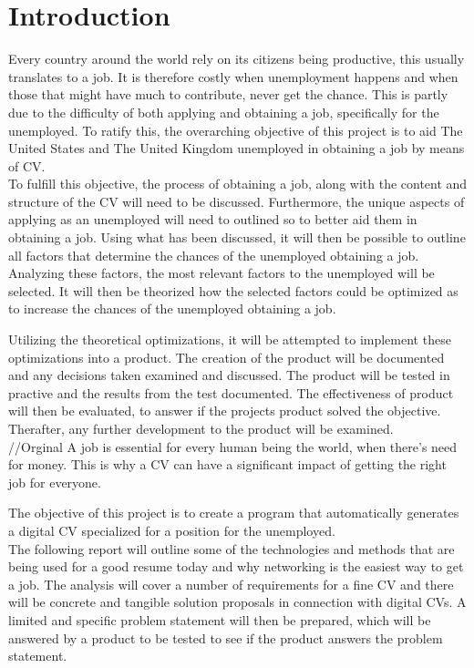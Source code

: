 \section{Introduction}\label{sec:introduction}
Every country around the world rely on its citizens being productive, this usually translates to a job. 
It is therefore costly when unemployment happens and when those that might have much to contribute, never get the chance. 
This is partly due to the difficulty of both applying and obtaining a job, specifically for the unemployed. 
To ratify this, the overarching objective of this project is to aid The United States and The United Kingdom unemployed in obtaining a job by means of CV. \\

To fulfill this objective, the process of obtaining a job, along with the content and structure of the CV will need to be discussed.
Furthermore, the unique aspects of applying as an unemployed will need to outlined so to better aid them in obtaining a job.
Using what has been discussed, it will then be possible to outline all factors that determine the chances of the unemployed obtaining a job. \\

Analyzing these factors, the most relevant factors to the unemployed will be selected.
It will then be theorized how the selected factors could be optimized as to increase the chances of the unemployed obtaining a job.

Utilizing the theoretical optimizations, it will be attempted to implement these optimizations into a product.
The creation of the product will be documented and any decisions taken examined and discussed. 
The product will be tested in practive and the results from the test documented.
The effectiveness of product will then be evaluated, to answer if the projects product solved the objective.
Therafter, any further development to the product will be examined. \\


//Orginal
A job is essential for every human being the world, when there's need for money. 
This is why a CV can have a significant impact of getting the right job for everyone.
 
The objective of this project is to create a program that automatically generates a digital CV 
specialized for a position for the unemployed. \\

The following report will outline some of the technologies and methods 
that are being used for a good resume today and why networking is the easiest way to get a job. 
The analysis will cover a number of requirements for a fine CV 
and there will be concrete and tangible solution proposals in connection with digital CVs. 
A limited and specific problem statement will then be prepared, 
which will be answered by a product to be tested to see if the product answers the problem statement.

\newpage


